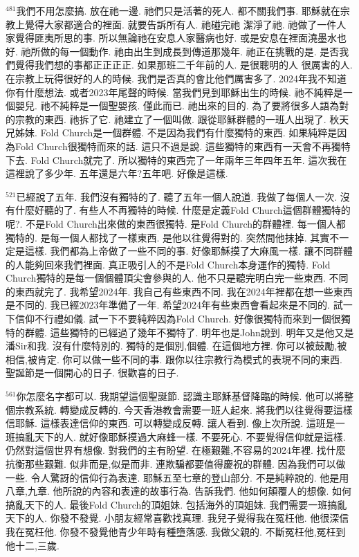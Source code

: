\documentclass{book}
\begin{document}
$^{481}$我們不用怎麼搞.
放在祂一邊.
祂們只是活著的死人.
都不關我們事.
耶穌就在宗教上覺得大家都適合的裡面.
就要告訴所有人.
祂碰完祂 潔淨了祂.
祂做了一件人家覺得匪夷所思的事.
所以無論祂在安息人家醫病也好.
或是安息在裡面澆墨水也好.
祂所做的每一個動作.
祂由出生到成長到傳道那幾年.
祂正在挑戰的是.
是否我們覺得我們想的事都正正正正.
如果那班二千年前的人.
是很聰明的人 很厲害的人.
在宗教上玩得很好的人的時候.
我們是否真的會比他們厲害多了.
2024年我不知道你有什麼想法.
或者2023年尾聲的時候.
當我們見到耶穌出生的時候.
祂不純粹是一個嬰兒.
祂不純粹是一個聖嬰孩.
僅此而已.
祂出來的目的.
為了要將很多人語為對的宗教的東西.
祂拆了它.
祂建立了一個叫做.
跟從耶穌群體的一班人出現了.
秋天兄姊妹.
Fold Church是一個群體.
不是因為我們有什麼獨特的東西.
如果純粹是因為Fold Church很獨特而來的話.
這只不過是說.
這些獨特的東西有一天會不再獨特下去.
Fold Church就完了.
所以獨特的東西完了一年兩年三年四年五年.
這次我在這裡說了多少年.
五年還是六年?五年吧.
好像是這樣.

$^{521}$已經說了五年.
我們沒有獨特的了.
聽了五年一個人說道.
我做了每個人一次.
沒有什麼好聽的了.
有些人不再獨特的時候.
什麼是定義Fold Church這個群體獨特的呢?.
不是Fold Church出來做的東西很獨特.
是Fold Church的群體裡.
每一個人都獨特的.
是每一個人都找了一樣東西.
是他以往覺得對的.
突然間他抹掉.
其實不一定是這樣.
我們都為上帝做了一些不同的事.
好像耶穌摸了大麻風一樣.
讓不同群體的人能夠回來我們裡面.
真正吸引人的不是Fold Church本身運作的獨特.
Fold Church獨特的是每一個個體頂尖會參與的人.
他不只是聽完明白完一些東西.
不同的東西就完了.
我希望2024年.
我自己有些東西不同.
我在2024年裡都在想一些東西是不同的.
我已經2023年準備了一年.
希望2024年有些東西會看起來是不同的.
試一下信仰不行禮如儀.
試一下不要純粹因為Fold Church.
好像很獨特而來到一個很獨特的群體.
這些獨特的已經過了幾年不獨特了.
明年也是John說到.
明年又是他又是潘Sir和我.
沒有什麼特別的.
獨特的是個別,個體.
在這個地方裡.
你可以被鼓勵,被相信,被肯定.
你可以做一些不同的事.
跟你以往宗教行為模式的表現不同的東西.
聖誕節是一個開心的日子.
很歡喜的日子.

$^{561}$你怎麼名字都可以.
我期望這個聖誕節.
認識主耶穌基督降臨的時候.
他可以將整個宗教系統.
轉變成反轉的.
今天香港教會需要一班人起來.
將我們以往覺得要這樣信耶穌.
這樣表達信仰的東西.
可以轉變成反轉.
讓人看到.
像上次所說.
這班是一班搞亂天下的人.
就好像耶穌摸過大麻蜂一樣.
不要死心.
不要覺得信仰就是這樣.
仍然對這個世界有想像.
對我們的主有盼望.
在極艱難,不容易的2024年裡.
找什麼抗衡那些艱難.
似非而是,似是而非.
連欺騙都要值得慶祝的群體.
因為我們可以做一些.
令人驚訝的信仰行為表達.
耶穌五至七章的登山部分.
不是純粹說的.
他是用八章,九章.
他所說的內容和表達的故事行為.
告訴我們.
他如何顛覆人的想像.
如何搞亂天下的人.
最後Fold Church的頂姐妹.
包括海外的頂姐妹.
我們需要一班搞亂天下的人.
你發不發覺.
小朋友經常喜歡找真理.
我兒子覺得我在冤枉他.
他很深信我在冤枉他.
你發不發覺他青少年時有種墮落感.
我做父親的.
不斷冤枉他,冤枉到他十二,三歲.
\end{document}
